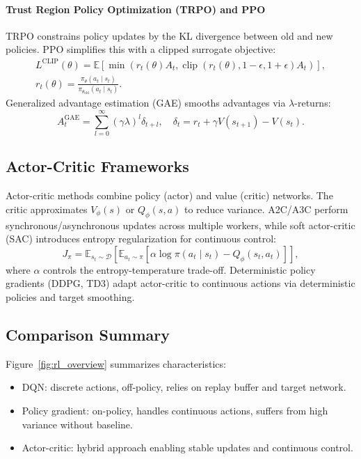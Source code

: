 \documentclass{article}
\begin{document}
\paragraph{Trust Region Policy Optimization (TRPO) and PPO}
TRPO constrains policy updates by the KL divergence between old and new policies. PPO simplifies this with a clipped surrogate objective:
\begin{align}
  L^{\text{CLIP}}(\theta) = \mathbb{E}\left[ \min\left( r_t(\theta) A_t, \operatorname{clip}(r_t(\theta), 1 - \epsilon, 1 + \epsilon) A_t \right) \right], \\
  r_t(\theta) = \frac{\pi_{\theta}(a_t \mid s_t)}{\pi_{\theta_{\text{old}}}(a_t \mid s_t)}.
\end{align}
Generalized advantage estimation (GAE) smooths advantages via $\lambda$-returns:
\begin{equation}
  A_t^{\text{GAE}} = \sum_{l=0}^{\infty} (\gamma \lambda)^l \delta_{t+l}, \quad \delta_t = r_t + \gamma V(s_{t+1}) - V(s_t).
\end{equation}

\subsection{Actor-Critic Frameworks}
Actor-critic methods combine policy (actor) and value (critic) networks. The critic approximates $V_{\phi}(s)$ or $Q_{\phi}(s, a)$ to reduce variance. A2C/A3C perform synchronous/asynchronous updates across multiple workers, while soft actor-critic (SAC) introduces entropy regularization for continuous control:
\begin{equation}
  J_{\pi} = \mathbb{E}_{s_t \sim \mathcal{D}} \left[ \mathbb{E}_{a_t \sim \pi} \left[\alpha \log \pi(a_t \mid s_t) - Q_{\phi}(s_t, a_t)\right] \right],
\end{equation}
where $\alpha$ controls the entropy-temperature trade-off. Deterministic policy gradients (DDPG, TD3) adapt actor-critic to continuous actions via deterministic policies and target smoothing.

\subsection{Comparison Summary}
Figure~\ref{fig:rl_overview} summarizes characteristics:
\begin{itemize}
  \item DQN: discrete actions, off-policy, relies on replay buffer and target network.
  \item Policy gradient: on-policy, handles continuous actions, suffers from high variance without baseline.
  \item Actor-critic: hybrid approach enabling stable updates and continuous control.
\end{itemize}
\end{document}
